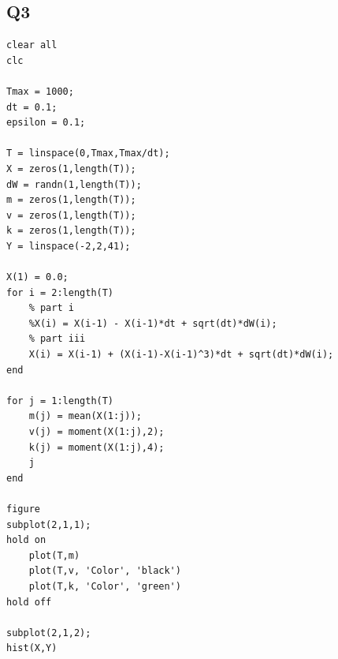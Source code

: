 \documentclass[11pt]{article} %
\begin{document}
\subsection{Q3}
\begin{verbatim}
clear all
clc

Tmax = 1000;
dt = 0.1;
epsilon = 0.1;

T = linspace(0,Tmax,Tmax/dt);
X = zeros(1,length(T));
dW = randn(1,length(T));
m = zeros(1,length(T));
v = zeros(1,length(T));
k = zeros(1,length(T));
Y = linspace(-2,2,41);

X(1) = 0.0;
for i = 2:length(T)
    % part i
    %X(i) = X(i-1) - X(i-1)*dt + sqrt(dt)*dW(i);
    % part iii
    X(i) = X(i-1) + (X(i-1)-X(i-1)^3)*dt + sqrt(dt)*dW(i);
end

for j = 1:length(T)
    m(j) = mean(X(1:j));
    v(j) = moment(X(1:j),2);
    k(j) = moment(X(1:j),4);
    j
end

figure
subplot(2,1,1);
hold on
    plot(T,m)
    plot(T,v, 'Color', 'black')
    plot(T,k, 'Color', 'green')
hold off

subplot(2,1,2);
hist(X,Y)
\end{verbatim}
\end{document}
